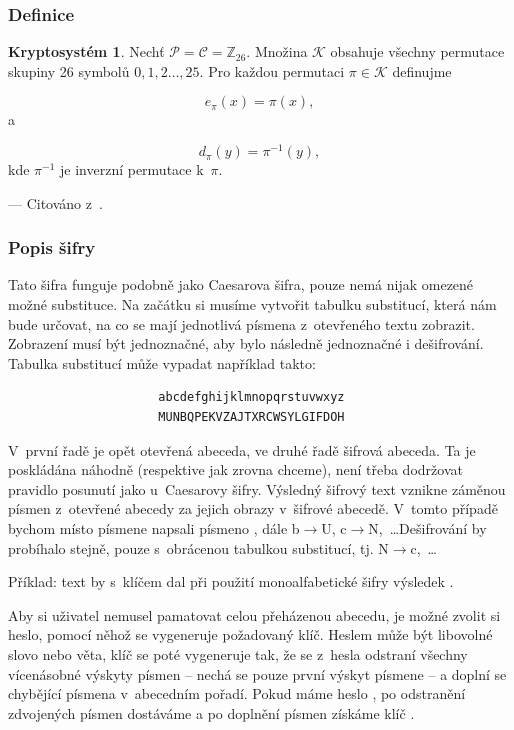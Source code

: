 \documentclass[12pt]{article}
\theoremstyle{definition}
\newtheorem{crypto}{Kryptosystém}
\newcommand{\cit}[1]{--- Citováno z~\cite{#1}.}
\newcommand{\setp}{\mathcal{P}}
\newcommand{\setc}{\mathcal{C}}
\newcommand{\setk}{\mathcal{K}}
\newcommand{\setz}{\mathbb{Z}}
\newcommand{\alp}{_{26}}
\begin{document}
\subsubsection{Definice}
\begin{crypto}
Nechť $\setp=\setc=\setz\alp$. Množina $\setk$ obsahuje všechny permutace skupiny 26 symbolů $0,1,2\ldots,25$. Pro každou permutaci $\pi\in\setk$ definujme 

$$e_\pi\left(x\right)=\pi(x),$$
a 

$$d_\pi\left(y\right)=\pi^{-1}\left(y\right),$$
kde $\pi^{-1}$ je inverzní permutace k~$\pi$. 
\end{crypto}

\cit{cryptography}

\subsubsection{Popis šifry}
Tato šifra funguje podobně jako Caesarova šifra, pouze nemá nijak omezené možné substituce. Na začátku si musíme vytvořit tabulku substitucí, která nám bude určovat, na co se mají jednotlivá písmena z~otevřeného textu zobrazit. Zobrazení musí být jednoznačné, aby bylo následně jednoznačné i dešifrování. Tabulka substitucí může vypadat například takto:

\begin{verbatim}
                     abcdefghijklmnopqrstuvwxyz
                     MUNBQPEKVZAJTXRCWSYLGIFDOH
\end{verbatim}

V~první řadě je opět otevřená abeceda, ve druhé řadě šifrová abeceda. Ta je poskládána náhodně (respektive jak zrovna chceme), není třeba dodržovat pravidlo posunutí jako u~Caesarovy šifry. Výsledný šifrový text vznikne záměnou písmen z~otevřené abecedy za jejich obrazy v~šifrové abecedě. V~tomto případě bychom místo písmene  napsali písmeno , dále b$\rightarrow$U, c$\rightarrow$N,~\dots Dešifrování by probíhalo stejně, pouze s~obrácenou tabulkou substitucí, tj. N$\rightarrow$c,~\dots

Příklad: text  by s~klíčem  dal při použití monoalfabetické šifry výsledek . 

Aby si uživatel nemusel pamatovat celou přeházenou abecedu, je možné zvolit si heslo, pomocí něhož se vygeneruje požadovaný klíč. Heslem může být libovolné slovo nebo věta, klíč se poté vygeneruje tak, že se z~hesla odstraní všechny vícenásobné výskyty písmen -- nechá se pouze první výskyt písmene -- a doplní se chybějící písmena v~abecedním pořadí. Pokud máme heslo , po odstranění zdvojených písmen dostáváme  a po doplnění písmen získáme klíč . 
\end{document}
